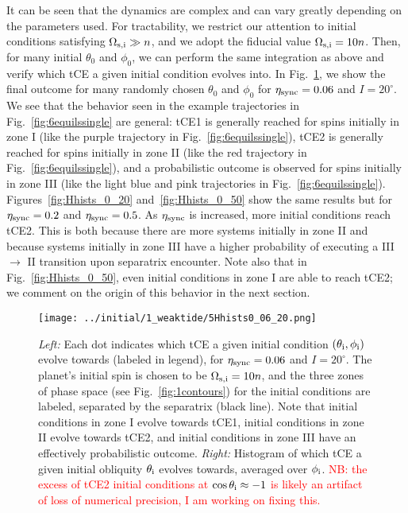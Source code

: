 \documentclass[
        fleqn,
        usenatbib,
    ]{mnras}
\begin{document}
It can be seen that the dynamics are complex and can vary greatly depending on
the parameters used. For tractability, we restrict our attention to initial
conditions satisfying $\Omega_{\rm s, i} \gg n$, and we adopt the fiducial value
$\Omega_{\rm s, i} = 10n$. Then, for many initial $\theta_0$ and $\phi_0$, we
can perform the same integration as above and verify which tCE a given initial
condition evolves into. In Fig.~\ref{fig:Hhists_0_06}, we show the final outcome
for many randomly chosen $\theta_0$ and $\phi_0$ for $\eta_{\rm sync} = 0.06$
and $I = 20^\circ$. We see that the behavior seen in the example trajectories in
Fig.~\ref{fig:6equilssingle} are general: tCE1 is generally reached for spins
initially in zone I (like the purple trajectory in
Fig.~\ref{fig:6equilssingle}), tCE2 is generally reached for spins initially in
zone II (like the red trajectory in Fig.~\ref{fig:6equilssingle}), and a
probabilistic outcome is observed for spins initially in zone III (like the
light blue and pink trajectories in Fig.~\ref{fig:6equilssingle}).
Figures~\ref{fig:Hhists_0_20} and~\ref{fig:Hhists_0_50} show the same results
but for $\eta_{\rm sync} = 0.2$ and $\eta_{\rm sync} = 0.5$. As $\eta_{\rm
sync}$ is increased, more initial conditions reach tCE2. This is both because
there are more systems initially in zone II and because systems initially in
zone III have a higher probability of executing a III $\to$ II transition upon
separatrix encounter. Note also that in Fig.~\ref{fig:Hhists_0_50}, even initial
conditions in zone I are able to reach tCE2; we comment on the origin of this
behavior in the next section.
\begin{figure}
    \centering
    \texttt{[image: ../initial/1\_weaktide/5Hhists0\_06\_20.png]}
    \caption{\emph{Left:} Each dot indicates which tCE a given initial condition
    $(\theta_{\rm i}, \phi_{\rm i})$ evolve towards (labeled in legend), for
    $\eta_{\rm sync} = 0.06$ and $I = 20^\circ$. The planet's initial spin is
    chosen to be $\Omega_{\rm s, i} = 10n$, and the three zones of phase space
    (see Fig.~\ref{fig:1contours}) for the initial conditions are labeled,
    separated by the separatrix (black line). Note that initial conditions in
    zone I evolve towards tCE1, initial conditions in zone II evolve towards
    tCE2, and initial conditions in zone III have an effectively probabilistic
    outcome. \emph{Right:} Histogram of which tCE a given initial obliquity
    $\theta_{\rm i}$ evolves towards, averaged over $\phi_{\rm
    i}$.
    \textcolor{red}{NB\@: the excess of tCE2 initial conditions at $\cos
    \theta_{\rm i} \approx -1$ is likely an artifact of loss of numerical
    precision, I am working on fixing this.}
    }\label{fig:Hhists_0_06}
\end{figure}
\end{document}
